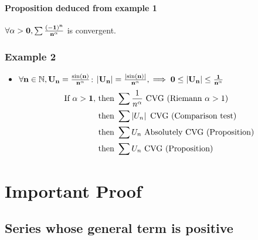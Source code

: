 \documentclass[notitlepage]{math}
\begin{document}
\paragraph{Proposition deduced from example 1}
$\bf \forall \alpha > 0, \sum \frac{(-1)^n}{n^\alpha}$ is convergent.
\subsubsection{Example 2}
\begin{itemize}
    \item $\bf \forall n \in \mathbb{N}, U_n = \frac{\sin(n)}{n^\alpha}$:
    $\bf \left\lvert U_n \right\rvert = \frac{\left\lvert \sin(n) \right\rvert}{n^\alpha}, \implies 0 \leq \left\lvert U_n \right\rvert \leq \frac{1}{n^\alpha}$\\[1em]
    \begin{align*}
        \text{If } \bf \alpha > 1, &\text{ then } \sum \frac{1}{n^\alpha} \text{ CVG (Riemann }\alpha > 1\text{)}\\
        &\text{ then } \sum \left\lvert U_n \right\rvert \text{ CVG (Comparison test)}\\
        &\text{ then } \sum U_n \text{ Absolutely CVG (Proposition)}\\
        &\text{ then } \sum U_n \text{ CVG (Proposition)}
    \end{align*}

\end{itemize}

\newpage
\section{Important Proof}
\subsection{Series whose general term is positive}
\end{document}
